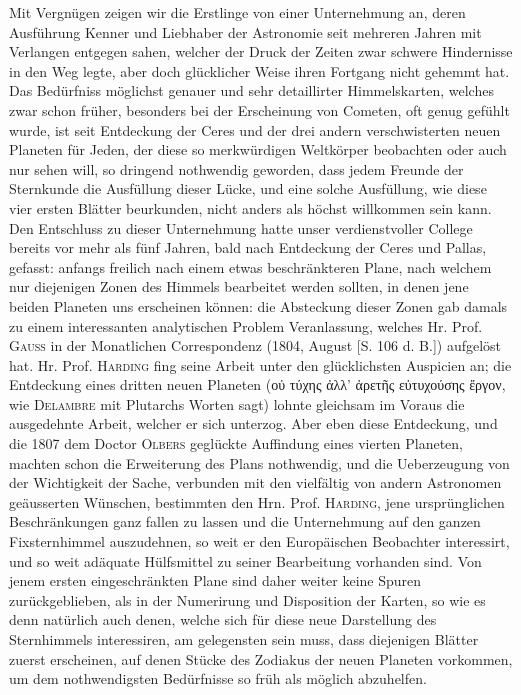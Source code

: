 Mit Vergnügen zeigen wir die Erstlinge von einer Unternehmung an, deren Ausführung Kenner und Liebhaber der Astronomie seit mehreren Jahren mit Verlangen entgegen sahen, welcher der Druck der Zeiten zwar schwere Hindernisse in den Weg legte, aber doch glücklicher Weise ihren Fortgang nicht gehemmt hat. Das Bedürfniss möglichst genauer und sehr detaillirter Himmelskarten, welches zwar schon früher, besonders bei der Erscheinung von Cometen, oft genug gefühlt wurde, ist seit Entdeckung der Ceres und der drei andern verschwisterten neuen Planeten für Jeden, der diese so merkwürdigen Weltkörper beobachten oder auch nur sehen will, so dringend nothwendig geworden, dass jedem Freunde der Sternkunde die Ausfüllung dieser Lücke, und eine solche Ausfüllung, wie diese vier ersten Blätter beurkunden, nicht anders als höchst willkommen sein kann. Den Entschluss zu dieser Unternehmung hatte unser verdienstvoller College bereits vor mehr als fünf Jahren, bald nach Entdeckung der Ceres und Pallas, gefasst: anfangs freilich nach einem etwas beschränkteren Plane, nach welchem nur diejenigen Zonen des Himmels bearbeitet werden sollten, in denen jene beiden Planeten uns erscheinen können: die Absteckung dieser Zonen gab damals zu einem interessanten analytischen Problem Veranlassung, welches Hr. Prof. \textsc{Gauss} in der Monatlichen Correspondenz (1804, August [S. 106 d. B.]) aufgelöst hat. Hr. Prof. \textsc{Harding} fing seine Arbeit unter den glücklichsten Auspicien an; die Entdeckung eines dritten neuen Planeten ({\LatitudeSymbols οὐ τύχης ἀλλ' ἀρετῆς εὐτυχούσης ἔργον}, wie \textsc{Delambre} mit Plutarchs Worten sagt) lohnte gleichsam im Voraus die ausgedehnte Arbeit, welcher er sich unterzog. Aber eben diese Entdeckung, und die 1807 dem Doctor \textsc{Olbers} geglückte Auffindung eines vierten Planeten, machten schon die Erweiterung des Plans nothwendig, und die Ueberzeugung von der Wichtigkeit der Sache, verbunden mit den vielfältig von andern Astronomen geäusserten Wünschen, bestimmten den Hrn. Prof. \textsc{Harding}, jene ursprünglichen Beschränkungen ganz fallen zu lassen und die Unternehmung auf den ganzen Fixsternhimmel auszudehnen, so weit er den Europäischen Beobachter interessirt, und so weit adäquate Hülfsmittel zu seiner Bearbeitung vorhanden sind. Von jenem ersten eingeschränkten Plane sind daher weiter keine Spuren zurückgeblieben, als in der Numerirung und Disposition der Karten, so wie es denn natürlich auch denen, welche sich für diese neue Darstellung des Sternhimmels interessiren, am gelegensten sein muss, dass diejenigen Blätter zuerst erscheinen, auf denen Stücke des Zodiakus der neuen Planeten vorkommen, um dem nothwendigsten Bedürfnisse so früh als möglich abzuhelfen.

